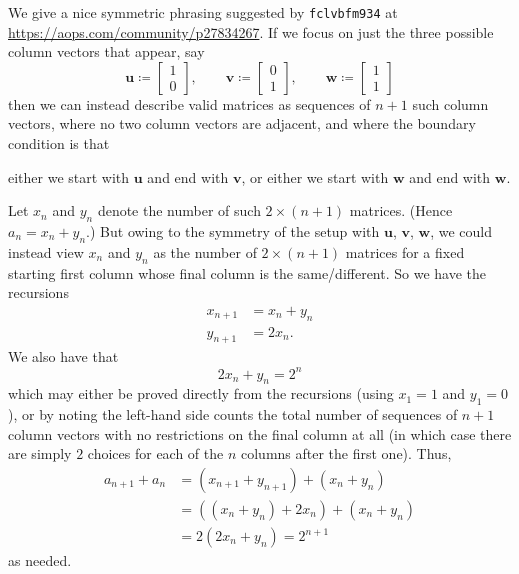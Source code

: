 \documentclass[11pt]{scrartcl}
\begin{document}
We give a nice symmetric phrasing suggested by \texttt{fclvbfm934} at
\url{https://aops.com/community/p27834267}.
If we focus on just the three possible column vectors that appear, say
\[
  \mathbf u \coloneqq \begin{bmatrix} 1 \\ 0 \end{bmatrix}, \qquad
  \mathbf v \coloneqq \begin{bmatrix} 0 \\ 1 \end{bmatrix}, \qquad
  \mathbf w \coloneqq \begin{bmatrix} 1 \\ 1 \end{bmatrix}
\]
then we can instead describe valid matrices
as sequences of $n+1$ such column vectors,
where no two column vectors are adjacent,
and where the boundary condition is that
\begin{itemize}
  \ii either we start with $\mathbf u$ and end with $\mathbf v$, or
  \ii either we start with $\mathbf w$ and end with $\mathbf w$.
\end{itemize}
Let $x_n$ and $y_n$ denote the number of such $2 \times (n+1)$ matrices.
(Hence $a_n = x_n + y_n$.)
But owing to the symmetry of the setup with $\mathbf u$, $\mathbf v$, $\mathbf w$,
we could instead view $x_n$ and $y_n$ as the number of $2 \times (n+1)$ matrices
for a fixed starting first column whose final column is the same/different.
So we have the recursions
\begin{align*}
  x_{n+1} &= x_n + y_n \\
  y_{n+1} &= 2x_n.
\end{align*}
We also have that
\[ 2x_n + y_n = 2^n \]
which may either be proved directly from the recursions (using $x_1 = 1$ and $y_1 = 0$),
or by noting the left-hand side counts the total number of sequences
of $n+1$ column vectors with no restrictions on the final column at all
(in which case there are simply $2$ choices for each of the $n$ columns
after the first one).
Thus,
\begin{align*}
  a_{n+1} + a_n &= (x_{n+1} + y_{n+1}) + (x_n + y_n) \\
  &= \left( (x_n + y_n) + 2x_n \right) + (x_n + y_n) \\
  &= 2(2x_n + y_n) = 2^{n+1}
\end{align*}
as needed.
\end{document}

